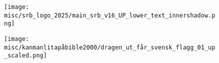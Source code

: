 \begin{figure}[h!]
  \centering
  \begin{adjustbox}{center}
    \texttt{[image: misc/srb\_logo\_2025/main\_srb\_v16\_UP\_lower\_text\_innershadow.png]}
  \end{adjustbox}
\end{figure}

\begin{figure}[h!]
  \centering
  \begin{adjustbox}{center}
    \texttt{[image: misc/kanmanlitapåbible2000/dragen\_ut\_får\_svensk\_flagg\_01\_up\_scaled.png]}
  \end{adjustbox}
\end{figure}